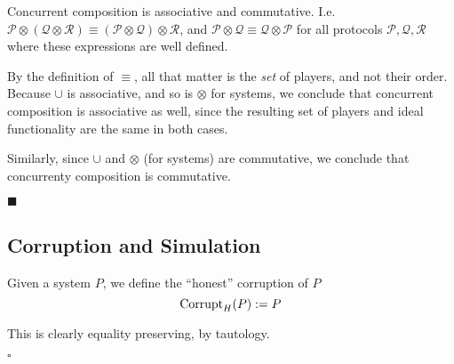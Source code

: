 \begin{lemma}
Concurrent composition is associative and commutative.
I.e. $\mathcal{P} \otimes (\mathcal{Q} \otimes \mathcal{R}) \equiv (\mathcal{P} \otimes \mathcal{Q}) \otimes \mathcal{R}$,
and $\mathcal{P} \otimes \mathcal{Q} \equiv \mathcal{Q} \otimes \mathcal{P}$ for
all protocols $\mathcal{P}, \mathcal{Q}, \mathcal{R}$ where these expressions
are well defined.


By the definition of $\equiv$, all that matter is the \emph{set} of players,
and not their order.
Because $\cup$ is associative, and so is $\otimes$ for systems,
we conclude that concurrent composition is associative as well,
since the resulting set of players and ideal functionality are the same
in both cases.

Similarly, since $\cup$ and $\otimes$ (for systems) are commutative,
we conclude that concurrenty composition is commutative.

$\blacksquare$
\end{lemma}

\subsection{Corruption and Simulation}

\begin{definition}
Given a system $P$,
we define the ``honest'' corruption of $P$
$$
\text{Corrupt}_H(P) := P
$$

This is clearly equality preserving, by tautology.

$\square$
\end{definition}

